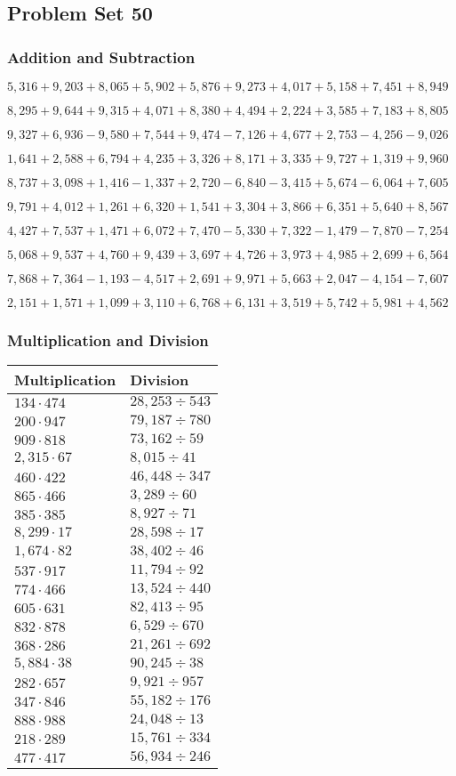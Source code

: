 \hypertarget{problem-set-50-2}{%
\subsection{Problem Set 50}\label{problem-set-50-2}}

\hypertarget{addition-and-subtraction-212}{%
\subsubsection{Addition and
Subtraction}\label{addition-and-subtraction-212}}

\(5,316+9,203+8,065+5,902+5,876+9,273+4,017+5,158+7,451+ 8,949\)

\(8,295+9,644+9,315+4,071+8,380+4,494+2,224+3,585+7,183+8,805\)

\(9,327+6,936-9,580+7,544+9,474-7,126+4,677+2,753-4,256-9,026\)

\(1,641+2,588+6,794+4,235+3,326+8,171+3,335+9,727+1,319+9,960\)

\(8,737+3,098+1,416-1,337+2,720-6,840-3,415+5,674-6,064+7,605\)

\(9,791+4,012+1,261+6,320+1,541+3,304+3,866+6,351+5,640+8,567\)

\(4,427+7,537+1,471+6,072+7,470-5,330+7,322-1,479-7,870-7,254\)

\(5,068+9,537+4,760+9,439+3,697+4,726+3,973+4,985+2,699+6,564\)

\(7,868+7,364-1,193-4,517+2,691+9,971+5,663+2,047-4,154-7,607\)

\(2,151+1,571+1,099+3,110+6,768+6,131+3,519+5,742+5,981+4,562\)

\hypertarget{multiplication-and-division-211}{%
\subsubsection{Multiplication and
Division}\label{multiplication-and-division-211}}

\begin{longtable}[]{@{}ll@{}}
\toprule
Multiplication & Division\tabularnewline
\midrule
\endhead
\(134\cdot474\) & \(28,253÷543\)\tabularnewline
\(200\cdot947\) & \(79,187÷780\)\tabularnewline
\(909\cdot818\) & \(73,162÷59\)\tabularnewline
\(2,315\cdot67\) & \(8,015÷41\)\tabularnewline
\(460\cdot422\) & \(46,448÷347\)\tabularnewline
\(865\cdot466\) & \(3,289÷60\)\tabularnewline
\(385\cdot385\) & \(8,927÷71\)\tabularnewline
\(8,299\cdot17\) & \(28,598÷17\)\tabularnewline
\(1,674\cdot82\) & \(38,402÷46\)\tabularnewline
\(537\cdot917\) & \(11,794÷92\)\tabularnewline
\(774\cdot466\) & \(13,524÷440\)\tabularnewline
\(605\cdot631\) & \(82,413÷95\)\tabularnewline
\(832\cdot878\) & \(6,529÷670\)\tabularnewline
\(368\cdot286\) & \(21,261÷692\)\tabularnewline
\(5,884\cdot38\) & \(90,245÷38\)\tabularnewline
\(282\cdot657\) & \(9,921÷957\)\tabularnewline
\(347\cdot846\) & \(55,182÷176\)\tabularnewline
\(888\cdot988\) & \(24,048÷13\)\tabularnewline
\(218\cdot289\) & \(15,761÷334\)\tabularnewline
\(477\cdot417\) & \(56,934÷246\)\tabularnewline
\bottomrule
\end{longtable}

